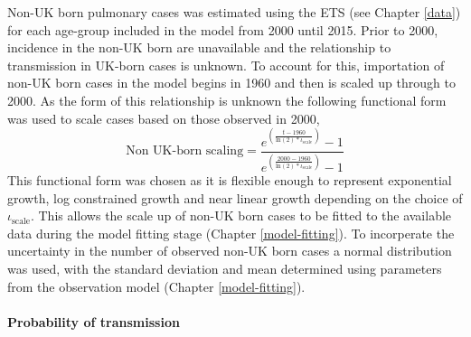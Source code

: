 \documentclass[11pt,twoside]{bristolthesis}
\begin{document}
  Non-UK born pulmonary cases was estimated using the ETS (see Chapter \ref{data}) for each age-group included in the model from 2000 until 2015. Prior to 2000, incidence in the non-UK born are unavailable and the relationship to transmission in UK-born cases is unknown. To account for this, importation of non-UK born cases in the model begins in 1960 and then is scaled up through to 2000. As the form of this relationship is unknown the following functional form was used to scale cases based on those observed in 2000,
  \begin{equation}
  \text{Non UK-born scaling} = \frac{e^{\left(\frac{t - 1960}{\text{ln}(2) * \iota_{\text{scale}}}\right)} - 1}{e^{\left(\frac{2000 - 1960}{\text{ln}(2) * \iota_{\text{scale}}}\right)} - 1}
    \label{eq:non-uk-born-scale}
  \end{equation}
  This functional form was chosen as it is flexible enough to represent exponential growth, log constrained growth and near linear growth depending on the choice of \(\iota_{\text{scale}}\). This allows the scale up of non-UK born cases to be fitted to the available data during the model fitting stage (Chapter \ref{model-fitting}). To incorperate the uncertainty in the number of observed non-UK born cases a normal distribution was used, with the standard deviation and mean determined using parameters from the observation model (Chapter \ref{model-fitting}).
  
  \hypertarget{probability-of-transmission}{%
  \paragraph{Probability of transmission}\label{probability-of-transmission}}
  
\end{document}
